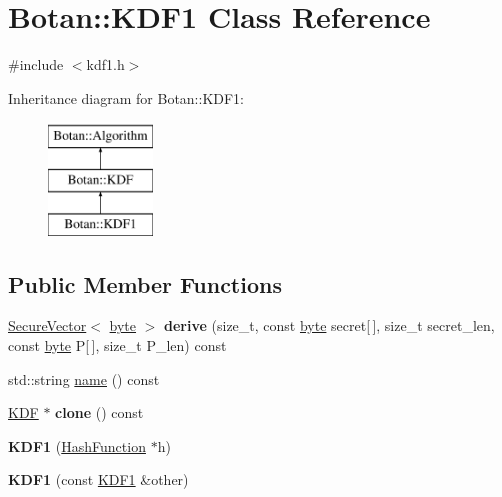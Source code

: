 \hypertarget{classBotan_1_1KDF1}{\section{Botan\-:\-:K\-D\-F1 Class Reference}
\label{classBotan_1_1KDF1}
}


{\ttfamily \#include $<$kdf1.\-h$>$}

Inheritance diagram for Botan\-:\-:K\-D\-F1\-:\begin{figure}[H]
\begin{center}
\leavevmode
\includegraphics[height=3.000000cm]{classBotan_1_1KDF1}
\end{center}
\end{figure}
\subsection*{Public Member Functions}
\begin{DoxyCompactItemize}
\item 
\hypertarget{classBotan_1_1KDF1_af2d40e11408672b6570950d338386c84}{\hyperlink{classBotan_1_1SecureVector}{Secure\-Vector}$<$ \hyperlink{namespaceBotan_a7d793989d801281df48c6b19616b8b84}{byte} $>$ {\bfseries derive} (size\-\_\-t, const \hyperlink{namespaceBotan_a7d793989d801281df48c6b19616b8b84}{byte} secret\mbox{[}$\,$\mbox{]}, size\-\_\-t secret\-\_\-len, const \hyperlink{namespaceBotan_a7d793989d801281df48c6b19616b8b84}{byte} P\mbox{[}$\,$\mbox{]}, size\-\_\-t P\-\_\-len) const }\label{classBotan_1_1KDF1_af2d40e11408672b6570950d338386c84}

\item 
std\-::string \hyperlink{classBotan_1_1KDF1_a7174c68cb9931feab1d27af6714f3739}{name} () const 
\item 
\hypertarget{classBotan_1_1KDF1_a6192ae2981148ef64decb05f5a50d3ed}{\hyperlink{classBotan_1_1KDF}{K\-D\-F} $\ast$ {\bfseries clone} () const }\label{classBotan_1_1KDF1_a6192ae2981148ef64decb05f5a50d3ed}

\item 
\hypertarget{classBotan_1_1KDF1_a36be8e8ef5bb97de05ec6246a07d4475}{{\bfseries K\-D\-F1} (\hyperlink{classBotan_1_1HashFunction}{Hash\-Function} $\ast$h)}\label{classBotan_1_1KDF1_a36be8e8ef5bb97de05ec6246a07d4475}

\item 
\hypertarget{classBotan_1_1KDF1_a49e1adc425427bd882d24e695aa1d3bd}{{\bfseries K\-D\-F1} (const \hyperlink{classBotan_1_1KDF1}{K\-D\-F1} \&other)}\label{classBotan_1_1KDF1_a49e1adc425427bd882d24e695aa1d3bd}

\end{DoxyCompactItemize}


